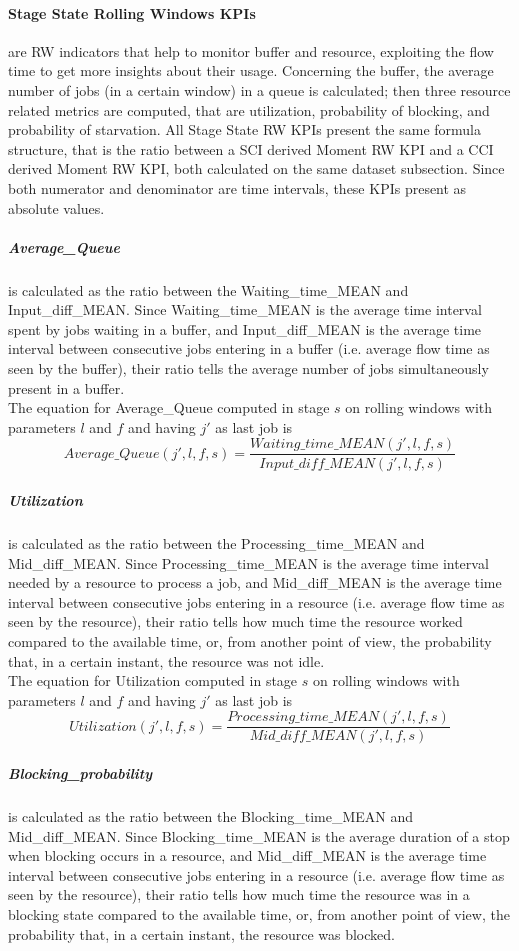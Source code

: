 \paragraph{Stage State Rolling Windows KPIs} are RW indicators that help to monitor buffer and resource, exploiting the flow time to get more insights about their usage. Concerning the buffer, the average number of jobs (in a certain window) in a queue is calculated; then three resource related metrics are computed, that are utilization, probability of blocking, and probability of starvation. All Stage State RW KPIs present the same formula structure, that is the ratio between a SCI derived Moment RW KPI and a CCI derived Moment RW KPI, both calculated on the same dataset subsection. Since both numerator and denominator are time intervals, these KPIs present as absolute values. 
\subparagraph{Average\_Queue} is calculated as the ratio between the Waiting\_time\_MEAN and Input\_diff\_MEAN. Since Waiting\_time\_MEAN is the average time interval spent by jobs waiting in a buffer, and Input\_diff\_MEAN is the average time interval between consecutive jobs entering in a buffer (i.e. average flow time as seen by the buffer), their ratio tells the average number of jobs simultaneously present in a buffer.\\
The equation for Average\_Queue computed in stage $s$ on rolling windows with parameters $l$ and $f$ and having $j'$ as last job is
\[Average\_Queue(j',l,f,s)=\frac{Waiting\_time\_MEAN(j',l,f,s)}{Input\_diff\_MEAN(j',l,f,s)}\]
\subparagraph{Utilization} is calculated as the ratio between the Processing\_time\_MEAN and Mid\_diff\_MEAN. Since Processing\_time\_MEAN is the average time interval needed by a resource to process a job, and Mid\_diff\_MEAN is the average time interval between consecutive jobs entering in a resource (i.e. average flow time as seen by the resource), their ratio tells how much time the resource worked compared to the available time, or, from another point of view, the probability that, in a certain instant, the resource was not idle. \\
The equation for Utilization computed in stage $s$ on rolling windows with parameters $l$ and $f$ and having $j'$ as last job is
\[Utilization(j',l,f,s)=\frac{Processing\_time\_MEAN(j',l,f,s)}{Mid\_diff\_MEAN(j',l,f,s)}\]
\subparagraph{Blocking\_probability} is calculated as the ratio between the Blocking\_time\_MEAN and Mid\_diff\_MEAN. Since Blocking\_time\_MEAN is the average duration of a stop when blocking occurs in a resource, and Mid\_diff\_MEAN is the average time interval between consecutive jobs entering in a resource (i.e. average flow time as seen by the resource), their ratio tells how much time the resource was in a blocking state compared to the available time, or, from another point of view, the probability that, in a certain instant, the resource was blocked. \\
